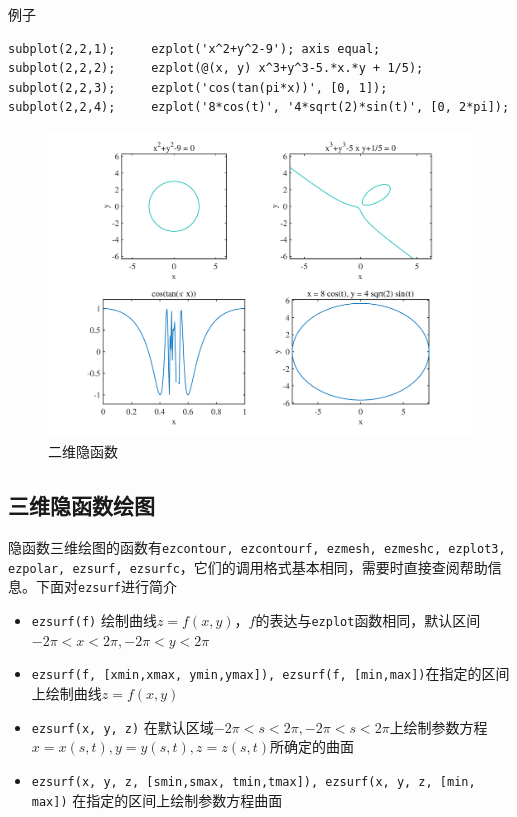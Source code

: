 例子
\begin{lstlisting}
subplot(2,2,1);		ezplot('x^2+y^2-9'); axis equal;
subplot(2,2,2);		ezplot(@(x, y) x^3+y^3-5.*x.*y + 1/5);
subplot(2,2,3);		ezplot('cos(tan(pi*x))', [0, 1]);
subplot(2,2,4);		ezplot('8*cos(t)', '4*sqrt(2)*sin(t)', [0, 2*pi]);
\end{lstlisting}

\begin{figure}[!htb]
	\centering
	\includegraphics[width=0.8\linewidth]{pic/二维隐函数.pdf}
	\vspace*{-2em}
	\caption{二维隐函数}
\end{figure}

\subsection{三维隐函数绘图}
 隐函数三维绘图的函数有\lstinline|ezcontour, ezcontourf, ezmesh, ezmeshc, ezplot3, ezpolar, ezsurf, ezsurfc|，它们的调用格式基本相同，需要时直接查阅帮助信息。下面对\lstinline|ezsurf|进行简介
\begin{itemize}
	\item \lstinline|ezsurf(f)|  \quad 绘制曲线$z = f(x,y)$，$f$的表达与\lstinline|ezplot|函数相同，默认区间$-2\pi < x < 2\pi, -2\pi < y < 2\pi$
	\item \lstinline|ezsurf(f, [xmin,xmax, ymin,ymax]), ezsurf(f, [min,max])|\quad 在指定的区间上绘制曲线$z = f(x,y)$
	\item \lstinline|ezsurf(x, y, z)| \quad 在默认区域$-2\pi < s< 2\pi, -2\pi < s< 2\pi$上绘制参数方程$x =x (s,t), y = y(s, t), z = z(s,t)$所确定的曲面
	\item \lstinline|ezsurf(x, y, z, [smin,smax, tmin,tmax]), ezsurf(x, y, z, [min, max])| \quad 在指定的区间上绘制参数方程曲面
\end{itemize}

